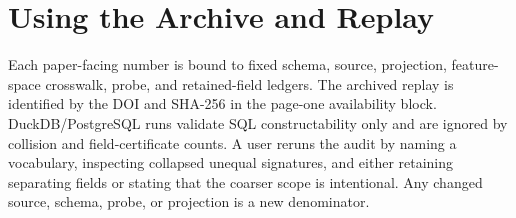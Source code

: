 \section{Using the Archive and Replay}
\label{sec:archive-replay}

Each paper-facing number is bound to fixed schema, source, projection, feature-space crosswalk, probe, and retained-field ledgers.  The archived replay is identified by the DOI and SHA-256 in the page-one availability block.  DuckDB/PostgreSQL runs validate SQL constructability only and are ignored by collision and field-certificate counts.  A user reruns the audit by naming a vocabulary, inspecting collapsed unequal signatures, and either retaining separating fields or stating that the coarser scope is intentional.  Any changed source, schema, probe, or projection is a new denominator.
